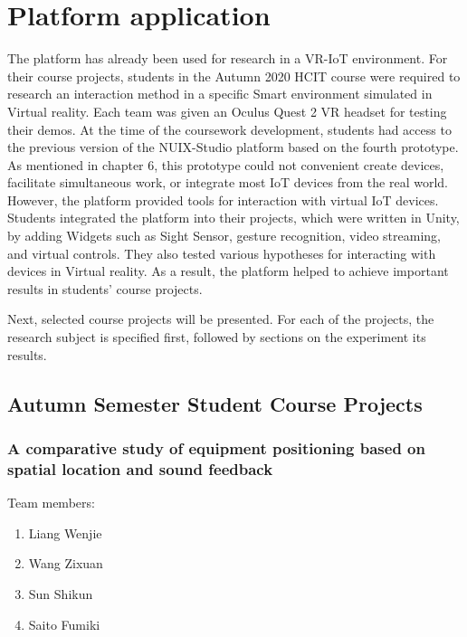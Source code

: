 
\chapter{Platform application}

The platform has already been used for research in a VR-IoT environment.
For their course projects, students in the Autumn 2020 HCIT course were required to research an interaction method in a specific Smart environment simulated in Virtual reality. Each team was given an Oculus Quest 2 VR headset for testing their demos. At the time of the coursework development, students had access to the previous version of the NUIX-Studio platform based on the fourth prototype. As mentioned in chapter 6, this prototype could not convenient create devices, facilitate simultaneous work, or integrate most IoT devices from the real world. However, the platform provided tools for interaction with virtual IoT devices. Students integrated the platform into their projects, which were written in Unity, by adding Widgets such as Sight Sensor, gesture recognition, video streaming, and virtual controls. They also tested various hypotheses for interacting with devices in Virtual reality. As a result, the platform helped to achieve important results in students' course projects. 

Next, selected course projects will be presented. For each of the projects, the research subject is specified first, followed by sections on the experiment its results.

\section{Autumn Semester Student Course Projects}

\subsection{A comparative study of equipment positioning based on spatial location and sound feedback}

Team members:
\begin{enumerate}
    \item Liang Wenjie
    \item Wang Zixuan
    \item Sun Shikun
    \item Saito Fumiki
\end{enumerate}

